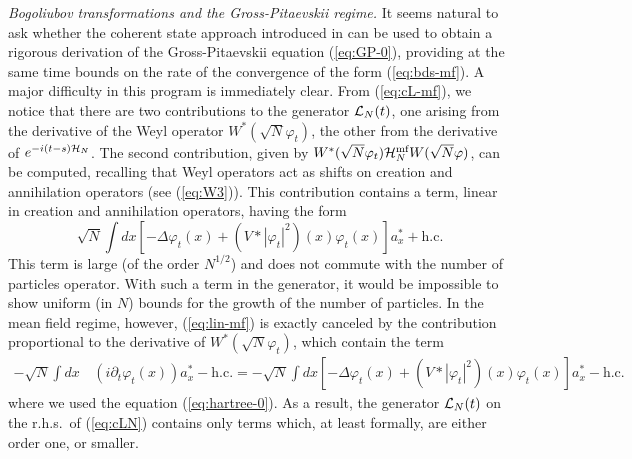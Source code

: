 \documentclass[11pt,a4paper]{article}
\newcommand{\cH}{{\cal H}}
\newcommand{\cL}{{\cal L}}
\begin{document}
{\it Bogoliubov transformations and the Gross-Pitaevskii regime.} It seems natural to ask whether the coherent state approach introduced in \cite{RS} can be used to obtain a rigorous derivation of the Gross-Pitaevskii equation (\ref{eq:GP-0}), providing at the same time bounds on the rate of the convergence of the form (\ref{eq:bds-mf}). A major difficulty in this program is immediately clear. 
{F}rom (\ref{eq:cL-mf}), we notice that there are two contributions to the generator $\cL_N (t)$, one 
 arising from the derivative of the Weyl operator $W^* (\sqrt{N}
 \varphi_t)$, the other from the derivative of $e^{-i (t-s) \cH_N}$. The
 second contribution, given by $W^* (\sqrt{N} \varphi_t) \cH^{\text{mf}}_N
 W(\sqrt{N} \varphi)$, can be computed, recalling that Weyl operators act as shifts on creation and annihilation operators (see (\ref{eq:W3})). This contribution contains a term, linear in creation and annihilation operators, having the form
\begin{equation}\label{eq:lin-mf}  \sqrt{N} \int dx \left[ -\Delta \varphi_t (x) + (V*|\varphi_t|^2) (x) \varphi_t (x) \right] a_x^* + \text{h.c.} \end{equation}
This term is large (of the order $N^{1/2}$) and does not commute with the number of particles operator. With such a term in the generator, it would be impossible to show uniform (in $N$) bounds for the growth of the number of particles. In the mean field regime, however, (\ref{eq:lin-mf}) is exactly 
canceled by the contribution proportional to the derivative of $W^* (\sqrt{N} \varphi_t)$, which contain the term
\[ \begin{split} -\sqrt{N} \int dx \, & ( i \partial_t \varphi_t (x) ) a_x^* - \text{h.c.} = -
\sqrt{N} \int dx \left[ -\Delta \varphi_t (x) + (V*|\varphi_t|^2) (x) \varphi_t (x) \right] a_x^* - \text{h.c.} 
\end{split}
\]
where we used the equation (\ref{eq:hartree-0}). As a result, the generator $\cL_N (t)$ on the r.h.s.\ of (\ref{eq:cLN}) contains only terms which, at least formally, are either order one, or smaller. 
\end{document}
